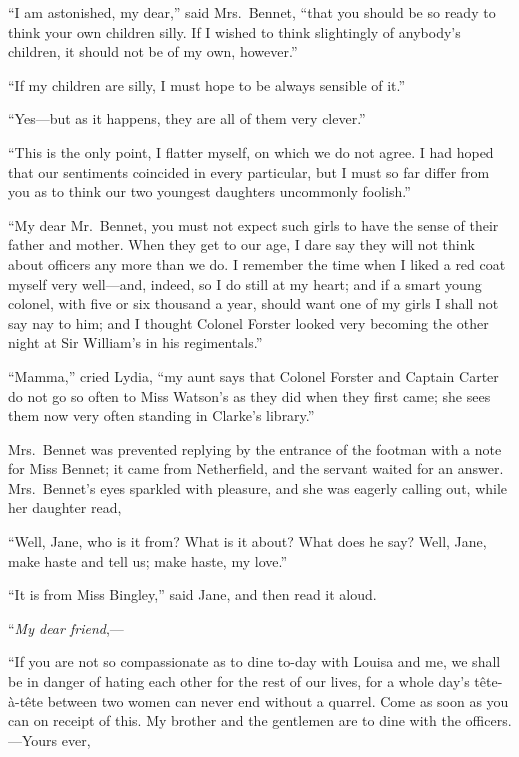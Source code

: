 ``I am astonished, my dear,'' said Mrs.\ Bennet, ``that you should
be so ready to think your own children silly.  If I wished to think
slightingly of anybody's children, it should not be of my own,
however.''

``If my children are silly, I must hope to be always sensible of it.''

``Yes---but as it happens, they are all of them very clever.''

``This is the only point, I flatter myself, on which we do not
agree.  I had hoped that our sentiments coincided in every
particular, but I must so far differ from you as to think our two
youngest daughters uncommonly foolish.''

``My dear Mr.\ Bennet, you must not expect such girls to have
the sense of their father and mother.  When they get to our age, I
dare say they will not think about officers any more than we do.
I remember the time when I liked a red coat myself very well---and,
indeed, so I do still at my heart; and if a smart young colonel,
with five or six thousand a year, should want one of my girls I
shall not say nay to him; and I thought Colonel Forster looked
very becoming the other night at Sir William's in his regimentals.''

``Mamma,'' cried Lydia, ``my aunt says that Colonel Forster and
Captain Carter do not go so often to Miss Watson's as they did
when they first came; she sees them now very often standing in
Clarke's library.''

Mrs.\ Bennet was prevented replying by the entrance of the
footman with a note for Miss Bennet; it came from Netherfield,
and the servant waited for an answer.  Mrs.\ Bennet's eyes
sparkled with pleasure, and she was eagerly calling out, while
her daughter read,

``Well, Jane, who is it from?  What is it about?  What does he
say?  Well, Jane, make haste and tell us; make haste, my love.''

``It is from Miss Bingley,'' said Jane, and then read it aloud.

\bigskip
``\emph{My dear friend},---
\medskip

``If you are not so compassionate as to dine to-day with Louisa
and me, we shall be in danger of hating each other for the rest
of our lives, for a whole day's t\^{e}te-\`{a}-t\^{e}te between two women
can never end without a quarrel.  Come as soon as you can on
receipt of this.  My brother and the gentlemen are to dine with
the officers.---Yours ever,

